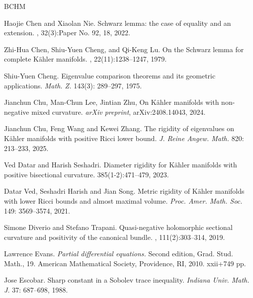\documentclass[12pt, reqno]{amsart}
\theoremstyle{plain}
\theoremstyle{definition}
\renewcommand{\>}{\rightarrow}
\renewcommand{\#}{\sharp}
\numberwithin{equation}{section} %
\begin{document}
\begin{thebibliography}{BCHM}


Haojie Chen and Xiaolan Nie.
\newblock Schwarz lemma: the case of equality and an extension.
, 32(3):Paper No. 92, 18, 2022.

Zhi-Hua Chen, Shiu-Yuen Cheng, and Qi-Keng Lu.
\newblock On the {S}chwarz lemma for complete {K}\"ahler manifolds.
, 22(11):1238--1247, 1979.


Shiu-Yuen Cheng. Eigenvalue comparison theorems and its geometric applications. \emph{Math. Z.} 143(3): 289--297, 1975.






Jianchun Chu, Man-Chun Lee, Jintian Zhu, On Kähler manifolds with non-negative mixed curvature.  {\em arXiv preprint},  arXiv:2408.14043, 2024.


Jianchun Chu,   Feng Wang and Kewei Zhang.
The rigidity of eigenvalues on K\"ahler manifolds with positive Ricci lower bound. \emph{J. Reine Angew. Math.} 820: 213--233,  2025.



Ved Datar and Harish Seshadri.
\newblock Diameter rigidity for {K}\"ahler manifolds with positive bisectional curvature.
 385(1-2):471--479,  2023.

 Datar Ved, Seshadri Harish and Jian Song. Metric rigidity of K\"ahler manifolds with lower Ricci bounds and almost maximal volume. \emph{Proc. Amer. Math. Soc.} 149: 3569--3574,  2021.

Simone Diverio and Stefano Trapani.
\newblock Quasi-negative holomorphic sectional curvature and positivity of the canonical bundle.
, 111(2):303--314, 2019.

 Lawrence Evans. \emph{Partial differential equations.}
Second edition, Grad. Stud. Math., 19. American Mathematical Society, Providence, RI, 2010. xxii+749 pp.


Jose Escobar.
Sharp constant in a Sobolev trace inequality.
\emph{Indiana Univ. Math. J.} 37: 687--698, 1988.


\end{thebibliography}
\end{document}
